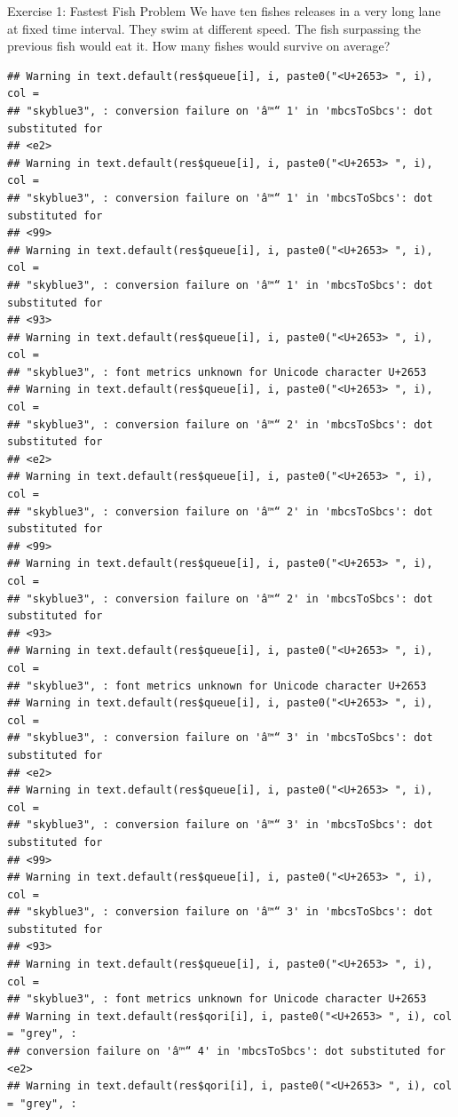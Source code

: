 \documentclass[
  10pt,
  ignorenonframetext,
  serif]{beamer}
\begin{document}
\begin{frame}[fragile]{Exercise 1: Fastest Fish Problem}
\protect\hypertarget{exercise-1-fastest-fish-problem}{}
We have ten fishes releases in a very long lane at fixed time interval.
They swim at different speed. The fish surpassing the previous fish
would eat it. How many fishes would survive on average?

\begin{verbatim}
## Warning in text.default(res$queue[i], i, paste0("<U+2653> ", i), col =
## "skyblue3", : conversion failure on 'â™“ 1' in 'mbcsToSbcs': dot substituted for
## <e2>
## Warning in text.default(res$queue[i], i, paste0("<U+2653> ", i), col =
## "skyblue3", : conversion failure on 'â™“ 1' in 'mbcsToSbcs': dot substituted for
## <99>
## Warning in text.default(res$queue[i], i, paste0("<U+2653> ", i), col =
## "skyblue3", : conversion failure on 'â™“ 1' in 'mbcsToSbcs': dot substituted for
## <93>
## Warning in text.default(res$queue[i], i, paste0("<U+2653> ", i), col =
## "skyblue3", : font metrics unknown for Unicode character U+2653
## Warning in text.default(res$queue[i], i, paste0("<U+2653> ", i), col =
## "skyblue3", : conversion failure on 'â™“ 2' in 'mbcsToSbcs': dot substituted for
## <e2>
## Warning in text.default(res$queue[i], i, paste0("<U+2653> ", i), col =
## "skyblue3", : conversion failure on 'â™“ 2' in 'mbcsToSbcs': dot substituted for
## <99>
## Warning in text.default(res$queue[i], i, paste0("<U+2653> ", i), col =
## "skyblue3", : conversion failure on 'â™“ 2' in 'mbcsToSbcs': dot substituted for
## <93>
## Warning in text.default(res$queue[i], i, paste0("<U+2653> ", i), col =
## "skyblue3", : font metrics unknown for Unicode character U+2653
## Warning in text.default(res$queue[i], i, paste0("<U+2653> ", i), col =
## "skyblue3", : conversion failure on 'â™“ 3' in 'mbcsToSbcs': dot substituted for
## <e2>
## Warning in text.default(res$queue[i], i, paste0("<U+2653> ", i), col =
## "skyblue3", : conversion failure on 'â™“ 3' in 'mbcsToSbcs': dot substituted for
## <99>
## Warning in text.default(res$queue[i], i, paste0("<U+2653> ", i), col =
## "skyblue3", : conversion failure on 'â™“ 3' in 'mbcsToSbcs': dot substituted for
## <93>
## Warning in text.default(res$queue[i], i, paste0("<U+2653> ", i), col =
## "skyblue3", : font metrics unknown for Unicode character U+2653
## Warning in text.default(res$qori[i], i, paste0("<U+2653> ", i), col = "grey", :
## conversion failure on 'â™“ 4' in 'mbcsToSbcs': dot substituted for <e2>
## Warning in text.default(res$qori[i], i, paste0("<U+2653> ", i), col = "grey", :

\end{verbatim}
\end{frame}
\end{document}

